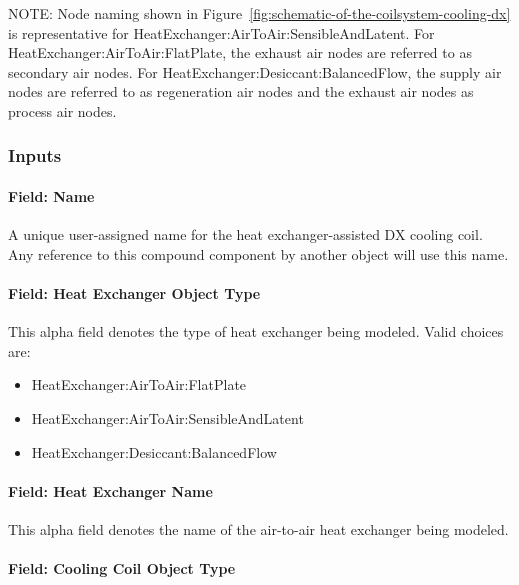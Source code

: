 NOTE: Node naming shown in Figure~\ref{fig:schematic-of-the-coilsystem-cooling-dx} is representative for HeatExchanger:AirToAir:SensibleAndLatent. For HeatExchanger:AirToAir:FlatPlate, the exhaust air nodes are referred to as secondary air nodes. For HeatExchanger:Desiccant:BalancedFlow, the supply air nodes are referred to as regeneration air nodes and the exhaust air nodes as process air nodes.

\subsubsection{Inputs}\label{inputs-25}

\paragraph{Field: Name}\label{field-name-24-000}

A unique user-assigned name for the heat exchanger-assisted DX cooling coil. Any reference to this compound component by another object will use this name.

\paragraph{Field: Heat Exchanger Object Type}\label{field-heat-exchanger-object-type-000}

This alpha field denotes the type of heat exchanger being modeled. Valid choices are:

\begin{itemize}
\item
  HeatExchanger:AirToAir:FlatPlate
\item
  HeatExchanger:AirToAir:SensibleAndLatent
\item
  HeatExchanger:Desiccant:BalancedFlow
\end{itemize}

\paragraph{Field: Heat Exchanger Name}\label{field-heat-exchanger-name-001}

This alpha field denotes the name of the air-to-air heat exchanger being modeled.

\paragraph{Field: Cooling Coil Object Type}\label{field-cooling-coil-object-type-1}

